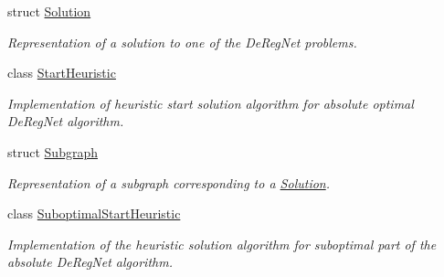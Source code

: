 \begin{DoxyCompactItemize}
struct \hyperlink{structderegnet_1_1Solution}{Solution}
\begin{DoxyCompactList}\small\item\em Representation of a solution to one of the De\+Reg\+Net problems. \end{DoxyCompactList}\item 
class \hyperlink{classderegnet_1_1StartHeuristic}{Start\+Heuristic}
\begin{DoxyCompactList}\small\item\em Implementation of heuristic start solution algorithm for absolute optimal De\+Reg\+Net algorithm. \end{DoxyCompactList}\item 
struct \hyperlink{structderegnet_1_1Subgraph}{Subgraph}
\begin{DoxyCompactList}\small\item\em Representation of a subgraph corresponding to a \hyperlink{structderegnet_1_1Solution}{Solution}. \end{DoxyCompactList}\item 
class \hyperlink{classderegnet_1_1SuboptimalStartHeuristic}{Suboptimal\+Start\+Heuristic}
\begin{DoxyCompactList}\small\item\em Implementation of the heuristic solution algorithm for suboptimal part of the absolute De\+Reg\+Net algorithm. \end{DoxyCompactList}\end{DoxyCompactItemize}
